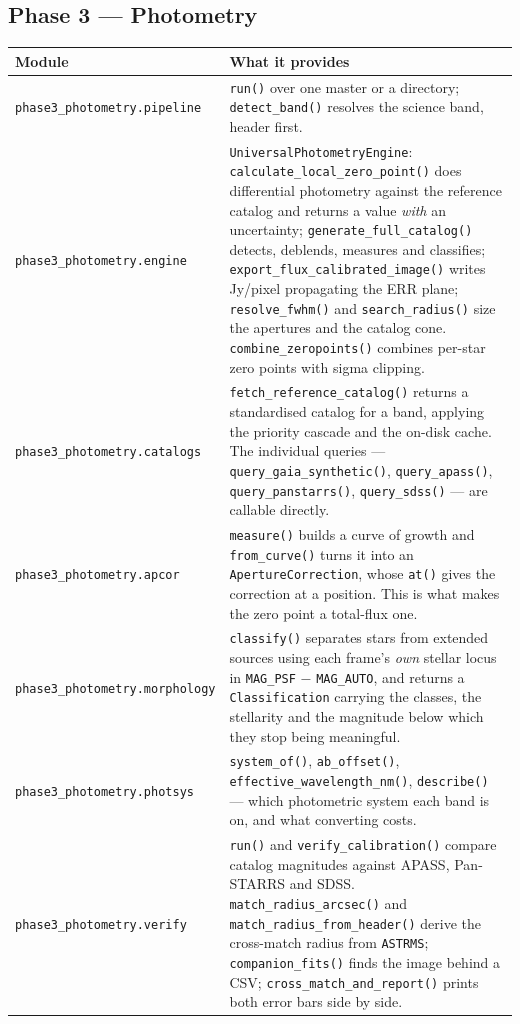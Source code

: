 \documentclass[11pt,a4paper]{article}
\begin{document}
\subsection{Phase 3 --- Photometry}
\begin{center}
\begin{longtable}{|p{3.6cm}|p{10.9cm}|}
\hline
\textbf{Module} & \textbf{What it provides} \\
\hline
\endhead
\texttt{phase3\_photometry.\allowbreak pipeline} & \texttt{run()} over one master or a directory; \texttt{detect\_band()} resolves the science band, header first. \\
\hline
\texttt{phase3\_photometry.\allowbreak engine} & \texttt{UniversalPhotometryEngine}: \texttt{calculate\_local\_zero\_point()} does differential photometry against the reference catalog and returns a value \emph{with} an uncertainty; \texttt{generate\_full\_catalog()} detects, deblends, measures and classifies; \texttt{export\_flux\_calibrated\_image()} writes Jy/pixel propagating the ERR plane; \texttt{resolve\_fwhm()} and \texttt{search\_radius()} size the apertures and the catalog cone. \texttt{combine\_zeropoints()} combines per-star zero points with sigma clipping. \\
\hline
\texttt{phase3\_photometry.\allowbreak catalogs} & \texttt{fetch\_reference\_catalog()} returns a standardised catalog for a band, applying the priority cascade and the on-disk cache. The individual queries --- \texttt{query\_gaia\_synthetic()}, \texttt{query\_apass()}, \texttt{query\_panstarrs()}, \texttt{query\_sdss()} --- are callable directly. \\
\hline
\texttt{phase3\_photometry.\allowbreak apcor} & \texttt{measure()} builds a curve of growth and \texttt{from\_curve()} turns it into an \texttt{ApertureCorrection}, whose \texttt{at()} gives the correction at a position. This is what makes the zero point a total-flux one. \\
\hline
\texttt{phase3\_photometry.\allowbreak morphology} & \texttt{classify()} separates stars from extended sources using each frame's \emph{own} stellar locus in \texttt{MAG\_PSF} $-$ \texttt{MAG\_AUTO}, and returns a \texttt{Classification} carrying the classes, the stellarity and the magnitude below which they stop being meaningful. \\
\hline
\texttt{phase3\_photometry.\allowbreak photsys} & \texttt{system\_of()}, \texttt{ab\_offset()}, \texttt{effective\_wavelength\_nm()}, \texttt{describe()} --- which photometric system each band is on, and what converting costs. \\
\hline
\texttt{phase3\_photometry.\allowbreak verify} & \texttt{run()} and \texttt{verify\_calibration()} compare catalog magnitudes against APASS, Pan-STARRS and SDSS. \texttt{match\_radius\_arcsec()} and \texttt{match\_radius\_from\_header()} derive the cross-match radius from \texttt{ASTRMS}; \texttt{companion\_fits()} finds the image behind a CSV; \texttt{cross\_match\_and\_report()} prints both error bars side by side. \\
\hline
\end{longtable}
\end{center}
\end{document}
